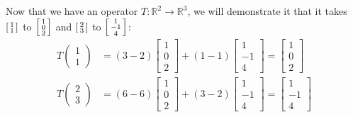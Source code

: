 \documentclass{article}
\newcommand{\icol}[1]{%
  \begin{bsmallmatrix}#1\end{bsmallmatrix}%
}
\begin{document}
Now that we have an operator $T:\mathbb R^2\to\mathbb R^3$, we will demonstrate it that it takes $\icol{1\\1}$ to $\icol{1\\0\\2}$ and $\icol{2\\3}$ to $\icol{1\\-1\\4}$:
\begin{align*}
  T\begin{pmatrix}
    1\\1
  \end{pmatrix}&=(3-2)\begin{bmatrix}
    1\\0\\2
  \end{bmatrix}+(1-1)\begin{bmatrix}
    1\\-1\\4
  \end{bmatrix}=\begin{bmatrix}
    1\\0\\2
  \end{bmatrix}\\
  T\begin{pmatrix}
    2\\3
  \end{pmatrix}&=(6-6)\begin{bmatrix}
    1\\0\\2
  \end{bmatrix}+(3-2)\begin{bmatrix}
    1\\-1\\4
  \end{bmatrix}=\begin{bmatrix}
    1\\-1\\4
  \end{bmatrix}
\end{align*}
\end{document}
